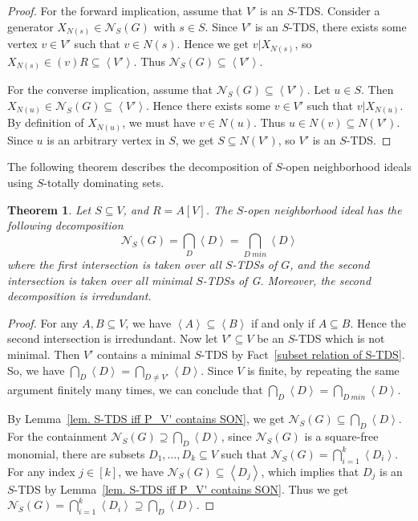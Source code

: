 \documentclass[12pt, reqno]{amsart}
\theoremstyle{definition}
\theoremstyle{plain}
\newtheorem{theorem}{Theorem}[subsection]
\theoremstyle{definition}
\newcommand\gen[1]{\left\langle #1 \right\rangle}
\newcommand{\NN}{\mathcal{N}}
\begin{document}
\begin{proof}
    For the forward implication, assume that $V'$ is an $S$-TDS.
    Consider a generator $X_{N(s)} \in \NN_S(G)$ with $s \in S$.
    Since $V'$ is an $S$-TDS, there exists some vertex $v \in V'$ such that $v \in N(s)$.
    Hence we get $v | X_{N(s)}$, so $X_{N(s)} \in (v)R \subseteq \gen{V'}$.
    Thus $\NN_S(G) \subseteq \gen{V'}$.

    For the converse implication, assume that $\NN_S(G) \subseteq \gen{V'}$.
    Let $u \in S$.
    Then $X_{N(u)} \in \NN_S(G) \subseteq \gen{V'}$.
    Hence there exists some $v \in V'$ such that $v | X_{N(u)}$.
    By definition of $X_{N(u)}$, we must have $v \in N(u)$.
    Thus $u \in N(v) \subseteq N(V')$.
    Since $u$ is an arbitrary vertex in $S$, we get $S \subseteq N(V')$, so $V'$ is an $S$-TDS.
\end{proof}

The following theorem describes the decomposition of $S$-open neighborhood ideals using $S$-totally dominating sets. 

\begin{theorem}\label{thm. decomp of SON}
    Let $S \subseteq V$, and $R = A[V]$.
    The $S$-open neighborhood ideal has the following decomposition
    $$
    \NN_S(G) = \bigcap_{D} \gen{D} = \bigcap_{D\ min} \gen{D}
    $$
    where the first intersection is taken over all $S$-TDSs of $G$, and the second intersection is taken over all minimal $S$-TDSs of G.
    Moreover, the second decomposition is irredundant.
\end{theorem}

\begin{proof}
    For any $A,B \subseteq V$, we have $\gen A \subseteq \gen B$ if and only if $A \subseteq B$.
    Hence the second intersection is irredundant.
    Now let $V' \subseteq V$ be an $S$-TDS which is not minimal.
    Then $V'$ contains a minimal $S$-TDS by Fact~\ref{subset relation of S-TDS}.
    So, we have $\bigcap_{D}\gen{D} = \bigcap_{D \neq V'}\gen D$.
    Since $V$ is finite, by repeating the same argument finitely many times, we can conclude that $\bigcap_{D} \gen{D} = \bigcap_{D\ min} \gen{D}$.

    By Lemma~\ref{lem. S-TDS iff P_V' contains SON}, we get $\NN_S(G) \subseteq \bigcap_{D} \gen{D}$.
    For the containment $\NN_S(G)\supseteq \bigcap_{D} \gen{D}$, since $\NN_S(G)$ is a square-free monomial, there are subsets $D_1,\dots,D_k\subseteq V$ such that $\NN_{S}(G) = \bigcap_{i = 1}^k \gen{D_i}$.
    For any index $j \in [k]$, we have $\NN_S(G) \subseteq \gen{D_j}$, which implies that $D_j$ is an $S$-TDS by Lemma~\ref{lem. S-TDS iff P_V' contains SON}.
    Thus we get $\NN_S(G) = \bigcap_{i = 1}^k \gen{D_i} \supseteq \bigcap_{D} \gen{D}$.
\end{proof}
\end{document}

